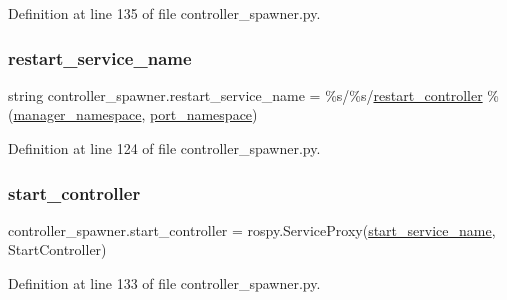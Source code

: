 Definition at line 135 of file controller\+\_\+spawner.\+py.

\mbox{\label{namespacecontroller__spawner_ae74db8f9d8ea66394dacfe6b0838e0b9}} 
\subsubsection{\texorpdfstring{restart\+\_\+service\+\_\+name}{restart\_service\_name}}
{\footnotesize\ttfamily string controller\+\_\+spawner.\+restart\+\_\+service\+\_\+name = \textquotesingle{}\%s/\%s/\hyperlink{namespacecontroller__spawner_ad1bd5e722a8cd83baf3a907520853c2d}{restart\+\_\+controller}\textquotesingle{} \% (\hyperlink{namespacecontroller__spawner_aee6b2ce8cdb4e7ffd894cbe211b09a0c}{manager\+\_\+namespace}, \hyperlink{namespacecontroller__spawner_a831390a07e2261094656c09e0d262c14}{port\+\_\+namespace})}



Definition at line 124 of file controller\+\_\+spawner.\+py.

\mbox{\label{namespacecontroller__spawner_a1bf65f27733e8e5fcb255dd8d369da6d}} 
\subsubsection{\texorpdfstring{start\+\_\+controller}{start\_controller}}
{\footnotesize\ttfamily controller\+\_\+spawner.\+start\+\_\+controller = rospy.\+Service\+Proxy(\hyperlink{namespacecontroller__spawner_a6f3556c19afc583ff9e7be62141ea1e3}{start\+\_\+service\+\_\+name}, Start\+Controller)}



Definition at line 133 of file controller\+\_\+spawner.\+py.

\mbox{\label{namespacecontroller__spawner_a6f3556c19afc583ff9e7be62141ea1e3}} 
